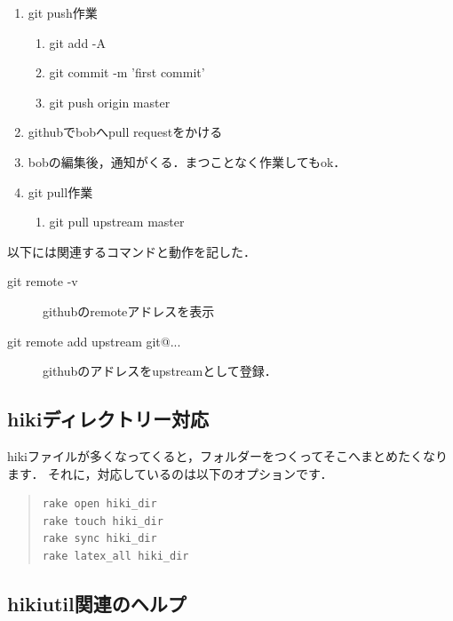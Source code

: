 \begin{enumerate}
\item git push作業
\begin{enumerate}
\item git add -A
\item git commit -m 'first commit'
\item git push origin master
\end{enumerate}
\item githubでbobへpull requestをかける
\item bobの編集後，通知がくる．まつことなく作業してもok．
\item git pull作業
\begin{enumerate}
\item git pull upstream master
\end{enumerate}
\end{enumerate}
以下には関連するコマンドと動作を記した．
\begin{description}
\item[git remote -v]  githubのremoteアドレスを表示

\item[git remote add upstream git@...] githubのアドレスをupstreamとして登録．

\end{description}
\subsection{hikiディレクトリー対応}
hikiファイルが多くなってくると，フォルダーをつくってそこへまとめたくなります．
それに，対応しているのは以下のオプションです．
\begin{quote}\begin{verbatim}
rake open hiki_dir
rake touch hiki_dir
rake sync hiki_dir
rake latex_all hiki_dir
\end{verbatim}\end{quote}
\subsection{hikiutil関連のヘルプ}

